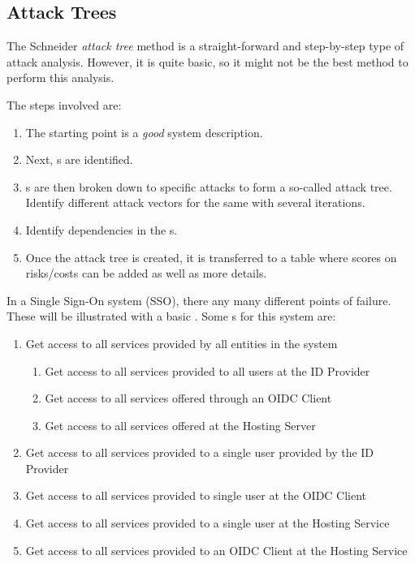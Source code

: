 \subsection{Attack Trees}\label{subsec:Attack_Trees}
\begin{definition}\label{def:Attack_Tree}
  The Schneider \emph{attack tree} method is a straight-forward and step-by-step type of attack analysis.
  However, it is quite basic, so it might not be the best method to perform this analysis.

  The steps involved are:
  \begin{enumerate}[noitemsep]
  \item The starting point is a \emph{good} system description.
  \item Next, s are identified.
  \item {}s are then broken down to specific attacks to form a so-called attack tree. Identify different attack vectors for the same  with several iterations.
  \item Identify dependencies in the s.
  \item Once the attack tree is created, it is transferred to a table where scores on risks/costs can be added as well as more details.
  \end{enumerate}
\end{definition}

In a Single Sign-On system (SSO), there any many different points of failure.
These will be illustrated with a basic .
Some s for this system are:
\begin{enumerate}[noitemsep]
\item Get access to all services provided by all entities in the system
  \begin{enumerate}[noitemsep]
  \item Get access to all services provided to all users at the ID Provider
  \item Get access to all services offered through an OIDC Client
  \item Get access to all services offered at the Hosting Server
  \end{enumerate}

\item Get access to all services provided to a single user provided by the ID Provider
\item Get access to all services provided to single user at the OIDC Client
\item Get access to all services provided to a single user at the Hosting Service
\item Get access to all services provided to an OIDC Client at the Hosting Service
\end{enumerate}

